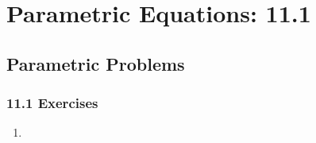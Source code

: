\chapter{Parametric Equations: 11.1}


\section{Parametric Problems}

\subsection{11.1 Exercises}
\begin{enumerate}[itemsep=3em]
  \item
\end{enumerate}
